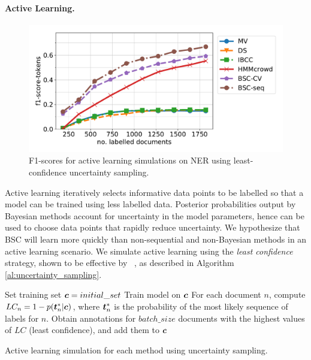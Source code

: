  \paragraph{Active Learning. }
 \begin{figure}[h]
 \centering
   \includegraphics[width=1\columnwidth, clip=True, trim=40 22 22 15]{figures/NER_AL/pool/plot_f1-score-tokens.pdf}
 \caption{F1-scores for active learning simulations on NER using least-confidence 
 uncertainty sampling.
 }
 \label{fig:alner}
 \end{figure}
 Active learning iteratively selects informative data points to be labelled so that a model can be trained
 using less labelled data. Posterior probabilities output by Bayesian methods 
 account for uncertainty in the model parameters, hence can be used to choose data points that rapidly reduce uncertainty. 
 We hypothesize that BSC will learn more quickly than non-sequential 
 and non-Bayesian methods
 in an active learning scenario. 
 We simulate active learning using 
 the \emph{least confidence} strategy, shown to be effective by 
 ~\citet{settles2008analysis},
 as described in Algorithm \ref{al:uncertainty_sampling}.
 \begin{algorithm}
 \DontPrintSemicolon
  \nl Set training set $\boldsymbol c=initial\_set$ \;
  {
  \nl Train model on $\boldsymbol c$ \;
  \nl For each document $n$, 
  compute $LC_n = 1-p(\boldsymbol t_n^*|\boldsymbol c)$, where $\boldsymbol t_n^*$ is the probability of the most likely sequence of labels 
  for $n$. \;
  \nl Obtain annotations for $batch\_size$ documents with the highest values of $LC$ (least confidence), and add them to $\boldsymbol c$\;
  }
 \caption{Active learning simulation for each method using uncertainty sampling.}
 \label{al:uncertainty_sampling}
 \end{algorithm}
 
